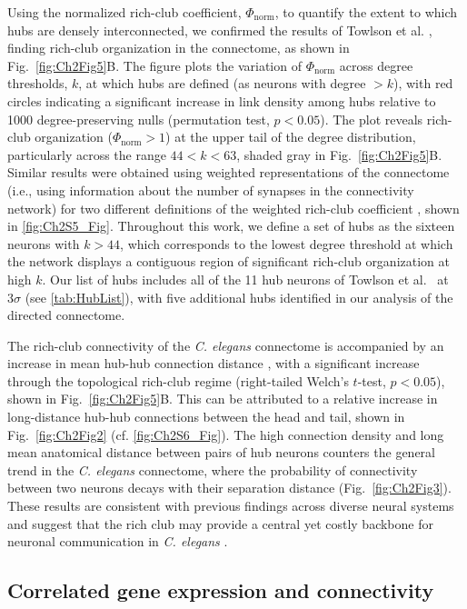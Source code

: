Using the normalized rich-club coefficient, $\Phi_\mathrm{norm}$, to quantify the extent to which hubs are densely interconnected, we confirmed the results of Towlson et al. \citep{Towlson2013}, finding rich-club organization in the connectome, as shown in Fig.~\ref{fig:Ch2Fig5}B.
The figure plots the variation of $\Phi_\mathrm{norm}$ across degree thresholds, $k$, at which hubs are defined (as neurons with degree $>k$), with red circles indicating a significant increase in link density among hubs relative to 1000 degree-preserving nulls (permutation test, $p < 0.05$).
The plot reveals rich-club organization ($\Phi_\mathrm{norm} > 1$) at the upper tail of the degree distribution, particularly across the range $44 < k < 63$, shaded gray in Fig.~\ref{fig:Ch2Fig5}B.
Similar results were obtained using weighted representations of the connectome (i.e., using information about the number of synapses in the connectivity network) for two different definitions of the weighted rich-club coefficient \citep{Opsahl2008}, shown in \ref{fig:Ch2S5_Fig}.
Throughout this work, we define a set of hubs as the sixteen neurons with $k > 44$, which corresponds to the lowest degree threshold at which the network displays a contiguous region of significant rich-club organization at high $k$.
Our list of hubs includes all of the 11 hub neurons of Towlson et al.~\citep{Towlson2013} at $3 \sigma$ (see \ref{tab:HubList}), with five additional hubs identified in our analysis of the directed connectome.

The rich-club connectivity of the \emph{C. elegans} connectome is accompanied by an increase in mean hub-hub connection distance \citep{Towlson2013}, with a significant increase through the topological rich-club regime (right-tailed Welch's $t$-test, $p < 0.05$), shown in Fig.~\ref{fig:Ch2Fig5}B.
This can be attributed to a relative increase in long-distance hub-hub connections between the head and tail, shown in Fig.~\ref{fig:Ch2Fig2} (cf. \ref{fig:Ch2S6_Fig}).
The high connection density and long mean anatomical distance between pairs of hub neurons counters the general trend in the \emph{C. elegans} connectome, where the probability of connectivity between two neurons decays with their separation distance (Fig.~\ref{fig:Ch2Fig3}).
These results are consistent with previous findings across diverse neural systems and suggest that the rich club may provide a central yet costly backbone for neuronal communication in \emph{C. elegans} \citep{VandenHeuvel2012, Towlson2013}.

\subsection{Correlated gene expression and connectivity}

